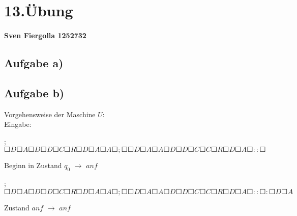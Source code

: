 \documentclass[10pt, a4paper]{article}
\begin{document}
\section*{13.Übung}
\paragraph{Sven Fiergolla 1252732}
\subsection*{Aufgabe a)}


\subsection*{Aufgabe b)}
Vorgehensweise der Maschine $U$:\\
\bigskip
Eingabe:\\
\begin{small}
;$\Square D\Square A\Square D\Square D\Square C\Square R\Square D\Square A\Square A\Square ;\Square \Square D\Square A\Square A\Square D\Square D\Square C\Square C\Square R\Square D\Square A\Square ::\Square $\\
\end{small}

Beginn in Zustand $q_0$ $\rightarrow$ $anf$\\
\begin{small}
;$\Square D\Square A\Square D\Square D\Square C\Square R\Square D\Square A\Square A\Square ;\Square \Square D\Square A\Square A\Square D\Square D\Square C\Square C\Square R\Square D\Square A\Square ::\Square : \Square D \Square A$\\
\end{small}

Zustand $anf$ $\rightarrow$ $anf$\\
\end{document}
